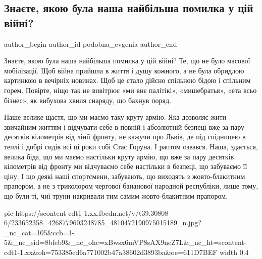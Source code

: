  
 
 
 
 
 
\subsection{Знаєте, якою була наша найбільша помилка у цій війні?}
\label{sec:09_08_2021.fb.podobna_evgenia.1.goruna_maguchih_vojna}
 
\ifcmt
 author_begin
   author_id podobna_evgenia
 author_end
\fi

Знаєте, якою була наша найбільша помилка у цій війні? Те, що не було  масової
мобілізації. Щоб війна прийшла в життя і душу кожного, а не була обридлою
картинкою в вечірніх новинах. Щоб це стало дійсно спільною бідою і спільним
горем. Повірте, ніщо так не вивітрює «ми внє палітікі», «мишебратья», «ета всьо
бізнес», як вибухова хвиля снаряду, що бахнув поряд. 

Наше велике щастя, що ми маємо таку круту армію. Яка дозволяє жити звичайним
життям і відчувати себе в повній і абсолютній безпеці вже за пару десятків
кілометрів від лінії фронту, не кажучи про Львів, де під спідницею в теплі і
добрі сидів всі ці роки собі Стас Горуна. І раптом озвався. Наша, здається,
велика біда, що ми маємо настільки круту армію, що вже за пару десятків
кілометрів від фронту ми відчуваємо себе настільки в безпеці, що забуваємо її
ціну. І що деякі наші спортсмени, забувають, що виходять з жовто-блакитним
прапором, а не з триколором чергової бананової народной республіки, лише тому,
що були ті, чиї труни накривали тим самим жовто-блакитним прапором. 


\ifcmt
   pic https://scontent-cdt1-1.xx.fbcdn.net/v/t39.30808-6/233652358_4268779603248785_4810472190975015189_n.jpg?_nc_cat=105&ccb=1-5&_nc_sid=8bfeb9&_nc_ohc=xBwsx6mVP8sAX9neZ7L&_nc_ht=scontent-cdt1-1.xx&oh=753385ed6a771002b47a38602d3893ba&oe=611D7BEF
	 width 0.4
\fi

